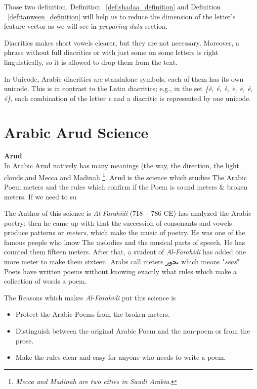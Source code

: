 Those two definition, Definition ~\ref{def:shadaa_definition} and Definition ~\ref{def:tanween_definition}  will help us to reduce the dimension of the letter's feature vector as we will see in \textit{preparing data} section.


Diacritics makes short vowels clearer, but they are not necessary.
Moreover, a phrase without full diacritics or with just some on some letters is
right linguistically, so it is allowed to drop them from the text.

In Unicode, Arabic diacritics are standalone symbols, each of them has its own
unicode. This is in contrast to the Latin diacritics; e.g., in the set
\textit{\{ê, é, è, ë, ē, ĕ, ě\}}, each combination of the letter \textit{e} and a diacritic is represented by one unicode.

\newpage

\section{Arabic Arud Science}
\begin{definition}\label{def:arud}
  \textbf{Arud} \hfill \\
  In Arabic Arud natively has many meanings (the way, the direction, the light clouds and Mecca and Madinah \footnote{\textit{Mecca and Madinah are two cities in  Saudi Arabia}.}\cite{AlQuaed}. Arud is the science which studies The Arabic Poem meters and the rules which confirm if the Poem is sound meters \& broken meters. If we need to su
\end{definition}
 
The Author of this science is \textit{Al-Farahidi} (718 – 786 CE) has analyzed the
Arabic poetry; then he came up with that the succession of consonants and vowels
produce patterns or \textit{meters}, which make the music of poetry. He was one of the famous people who know The melodies and the musical parts of speech. He has
counted them fifteen meters.  After that, a student of \textit{Al-Farahidi} has
added one more meter to make them sixteen. Arabs call meters \textarabic{بحور}
which means "\textit{seas}" Poets have written poems without knowing exactly what rules which make a collection of words a poem.

The Reasons which makes \textit{Al-Farahidi} put this science is

  \begin{itemize}
  \item Protect the Arabic Poems from the broken meters.
  \item Distinguish between the original Arabic Poem and the non-poem or from the prose.
    \item Make the rules clear and easy for anyone who needs to write a poem.
  \end{itemize}

